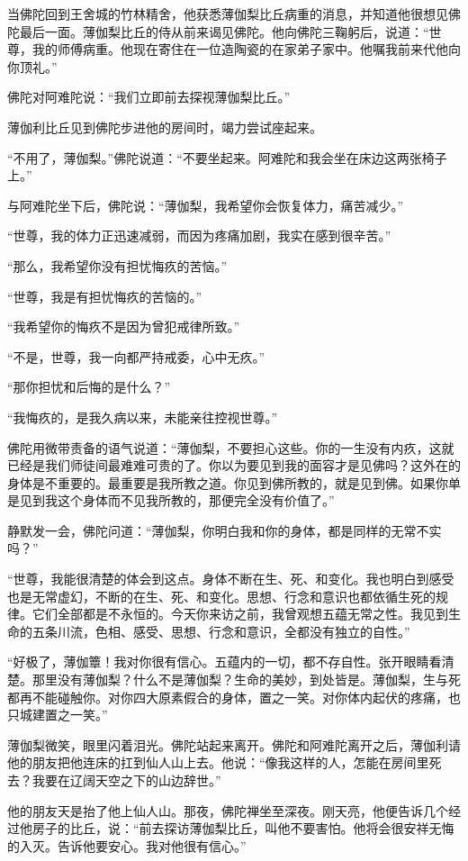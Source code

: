 \documentclass[12pt,twoside,openany]{book}
\begin{document}
当佛陀回到王舍城的竹林精舍，他获悉薄伽梨比丘病重的消息，并知道他很想见佛陀最后一面。薄伽梨比丘的侍从前来谒见佛陀。他向佛陀三鞠躬后，说道：“世尊，我的师傅病重。他现在寄住在一位造陶瓷的在家弟子家中。他嘱我前来代他向你顶礼。”

佛陀对阿难陀说：“我们立即前去探视薄伽梨比丘。”

薄伽利比丘见到佛陀步进他的房间时，竭力尝试座起来。

“不用了，薄伽梨。”佛陀说道：“不要坐起来。阿难陀和我会坐在床边这两张椅子上。”

与阿难陀坐下后，佛陀说：“薄伽梨，我希望你会恢复体力，痛苦减少。”

“世尊，我的体力正迅速减弱，而因为疼痛加剧，我实在感到很辛苦。”

“那么，我希望你没有担忧悔疚的苦恼。”

“世尊，我是有担忧悔疚的苦恼的。”

“我希望你的悔疚不是因为曾犯戒律所致。”

“不是，世尊，我一向都严持戒委，心中无疚。”

“那你担忧和后悔的是什么？”

“我悔疚的，是我久病以来，未能亲往控视世尊。”

佛陀用微带责备的语气说道：“薄伽梨，不要担心这些。你的一生没有内疚，这就已经是我们师徒间最难难可贵的了。你以为要见到我的面容才是见佛吗？这外在的身体是不重要的。最重要是我所教之道。你见到佛所教的，就是见到佛。如果你单是见到我这个身体而不见我所教的，那便完全没有价值了。”

静默发一会，佛陀问道：“薄伽梨，你明白我和你的身体，都是同样的无常不实吗？”

“世尊，我能很清楚的体会到这点。身体不断在生、死、和变化。我也明白到感受也是无常虚幻，不断的在生、死、和变化。思想、行念和意识也都依循生死的规律。它们全部都是不永恒的。今天你来访之前，我曾观想五蕴无常之性。我见到生命的五条川流，色相、感受、思想、行念和意识，全都没有独立的自性。”

“好极了，薄伽簟！我对你很有信心。五蕴内的一切，都不存自性。张开眼睛看清楚。那里没有薄伽梨？什么不是薄伽梨？生命的美妙，到处皆是。薄伽梨，生与死都再不能碰触你。对你四大原素假合的身体，置之一笑。对你体内起伏的疼痛，也只城建置之一笑。”

薄伽梨微笑，眼里闪着泪光。佛陀站起来离开。佛陀和阿难陀离开之后，薄伽利请他的朋友把他连床的扛到仙人山上去。他说：“像我这样的人，怎能在房间里死去？我要在辽阔天空之下的山边辞世。”

他的朋友天是抬了他上仙人山。那夜，佛陀禅坐至深夜。刚天亮，他便告诉几个经过他房子的比丘，说：“前去探访薄伽梨比丘，叫他不要害怕。他将会很安祥无悔的入灭。告诉他要安心。我对他很有信心。”
\end{document}
